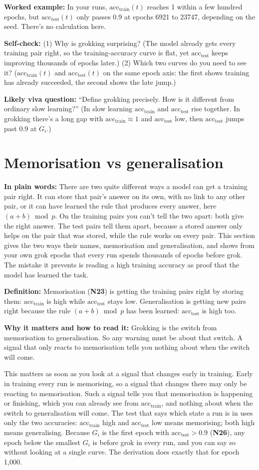 \documentclass[11pt,a4paper,oneside,openany]{report}
\newcommand{\acctest}{\mathrm{acc}_{\mathrm{test}}}
\newcommand{\acctrain}{\mathrm{acc}_{\mathrm{train}}}
\newcommand{\gl}[1]{\textbf{#1}}   %
\newcommand{\fplain}{\textbf{In plain words:} }
\newcommand{\fdef}{\textbf{Definition:} }
\newcommand{\fread}{\par\textbf{Why it matters and how to read it:} }
\newcommand{\fex}{\par\textbf{Worked example:} }
\newcommand{\fself}{\par\textbf{Self-check:} }
\newcommand{\fviva}{\par\textbf{Likely viva question:} }
\begin{document}
\fex In your runs, $\acctrain(t)$ reaches 1 within a few hundred epochs, but $\acctest(t)$ only passes 0.9 at epochs 6921 to 23747, depending on the seed. There's no calculation here.

\fself (1) Why is grokking surprising? (The model already gets every training pair right, so the training-accuracy curve is flat, yet $\acctest$ keeps improving thousands of epochs later.) (2) Which two curves do you need to see it? ($\acctrain(t)$ and $\acctest(t)$ on the same epoch axis: the first shows training has already succeeded, the second shows the late jump.)
\fviva ``Define grokking precisely. How is it different from ordinary slow learning?'' (In slow learning $\acctrain$ and $\acctest$ rise together. In grokking there's a long gap with $\acctrain \approx 1$ and $\acctest$ low, then $\acctest$ jumps past 0.9 at $G_i$.)

\section{Memorisation vs generalisation}
\fplain There are two quite different ways a model can get a training pair right. It can store that pair's answer on its own, with no link to any other pair, or it can have learned the rule that produces every answer, here $(a+b) \bmod p$. On the training pairs you can't tell the two apart: both give the right answer. The test pairs tell them apart, because a stored answer only helps on the pair that was stored, while the rule works on every pair. This section gives the two ways their names, memorisation and generalisation, and shows from your own grok epochs that every run spends thousands of epochs before grok. The mistake it prevents is reading a high training accuracy as proof that the model has learned the task.

\fdef Memorisation (\gl{N23}) is getting the training pairs right by storing them: $\acctrain$ is high while $\acctest$ stays low. Generalisation is getting new pairs right because the rule $(a+b) \bmod p$ has been learned: $\acctest$ is high too.
\fread Grokking is the switch from memorisation to generalisation. So any warning must be about that switch. A signal that only reacts to memorisation tells you nothing about when the switch will come.

This matters as soon as you look at a signal that changes early in training. Early in training every run is memorising, so a signal that changes there may only be reacting to memorisation. Such a signal tells you that memorisation is happening or finishing, which you can already see from $\acctrain$, and nothing about when the switch to generalisation will come. The test that says which state a run is in uses only the two accuracies: $\acctrain$ high and $\acctest$ low means memorising; both high means generalising. Because $G_i$ is the first epoch with $\acctest > 0.9$ (\gl{N26}), any epoch below the smallest $G_i$ is before grok in every run, and you can say so without looking at a single curve. The derivation does exactly that for epoch 1{,}000.
\end{document}
